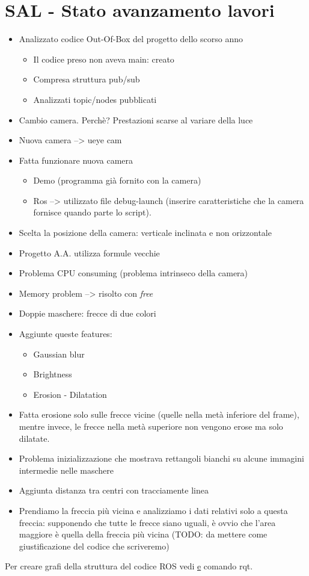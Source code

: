 \section{SAL - Stato avanzamento lavori}
\begin{itemize}
	\item Analizzato codice Out-Of-Box del progetto dello scorso anno
	\begin{itemize}
		\item Il codice preso non aveva main: creato
		\item Compresa struttura pub/sub
		\item Analizzati topic/nodes pubblicati
	\end{itemize}
	\item Cambio camera. Perchè? Prestazioni scarse al variare della luce
	\item Nuova camera --> ueye cam
	\item Fatta funzionare nuova camera
	\begin{itemize}
		\item Demo (programma già fornito con la camera)
		\item Ros --> utilizzato file debug-launch (inserire caratteristiche che la camera fornisce quando parte lo script).
	\end{itemize}
	\item Scelta la posizione della camera: verticale inclinata e non orizzontale
	\item Progetto A.A. utilizza formule vecchie
	\item Problema CPU consuming (problema intrinseco della camera)
	\item Memory problem --> risolto con \textit{free}
	\item Doppie maschere: frecce di due colori
	\item Aggiunte queste features:
	\begin{itemize}
		\item Gaussian blur
		\item Brightness
		\item Erosion - Dilatation
	\end{itemize}
	\item Fatta erosione solo sulle frecce vicine (quelle nella metà inferiore del frame), mentre invece, le frecce nella metà superiore non vengono erose ma solo dilatate.
	\item Problema inizializzazione che mostrava rettangoli bianchi su alcune immagini intermedie nelle maschere
	\item Aggiunta distanza tra centri con tracciamente linea
	\item Prendiamo la freccia più vicina e analizziamo i dati relativi solo a questa freccia: supponendo che tutte le frecce siano uguali, è ovvio che l'area maggiore è quella della freccia più vicina (TODO: da mettere come giustificazione del codice che scriveremo)
\end{itemize}

Per creare grafi della struttura del codice ROS vedi \href{http://wiki.ros.org/rqt} e comando rqt.